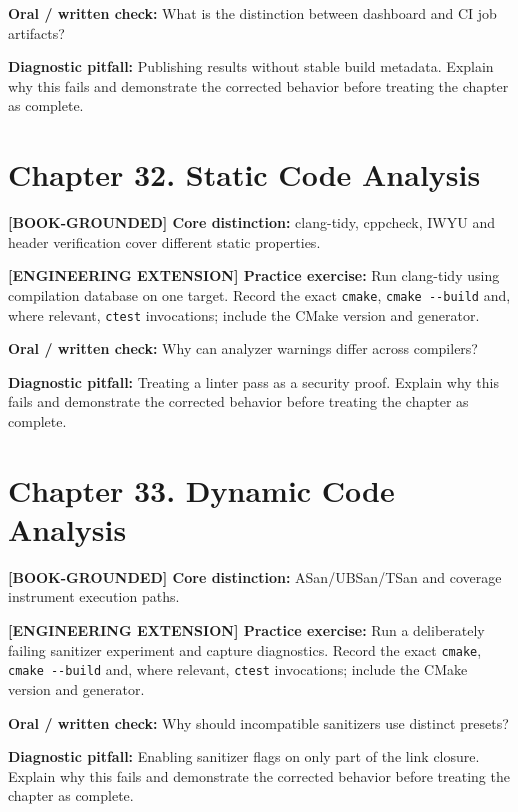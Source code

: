 \documentclass[11pt,letterpaper,oneside]{report}
\providecommand{\passthrough}[1]{#1}
\begin{document}
\textbf{Oral / written check:} What is the distinction between dashboard
and CI job artifacts?

\textbf{Diagnostic pitfall:} Publishing results without stable build
metadata. Explain why this fails and demonstrate the corrected behavior
before treating the chapter as complete.

\section{Chapter 32. Static Code
Analysis}\label{chapter-32.-static-code-analysis}

\textbf{{[}BOOK-GROUNDED{]} Core distinction:} clang-tidy, cppcheck,
IWYU and header verification cover different static properties.

\textbf{{[}ENGINEERING EXTENSION{]} Practice exercise:} Run clang-tidy
using compilation database on one target. Record the exact
\passthrough{\lstinline!cmake!}, \passthrough{\lstinline!cmake --build!}
and, where relevant, \passthrough{\lstinline!ctest!} invocations;
include the CMake version and generator.

\textbf{Oral / written check:} Why can analyzer warnings differ across
compilers?

\textbf{Diagnostic pitfall:} Treating a linter pass as a security proof.
Explain why this fails and demonstrate the corrected behavior before
treating the chapter as complete.

\section{Chapter 33. Dynamic Code
Analysis}\label{chapter-33.-dynamic-code-analysis}

\textbf{{[}BOOK-GROUNDED{]} Core distinction:} ASan/UBSan/TSan and
coverage instrument execution paths.

\textbf{{[}ENGINEERING EXTENSION{]} Practice exercise:} Run a
deliberately failing sanitizer experiment and capture diagnostics.
Record the exact \passthrough{\lstinline!cmake!},
\passthrough{\lstinline!cmake --build!} and, where relevant,
\passthrough{\lstinline!ctest!} invocations; include the CMake version
and generator.

\textbf{Oral / written check:} Why should incompatible sanitizers use
distinct presets?

\textbf{Diagnostic pitfall:} Enabling sanitizer flags on only part of
the link closure. Explain why this fails and demonstrate the corrected
behavior before treating the chapter as complete.
\end{document}
